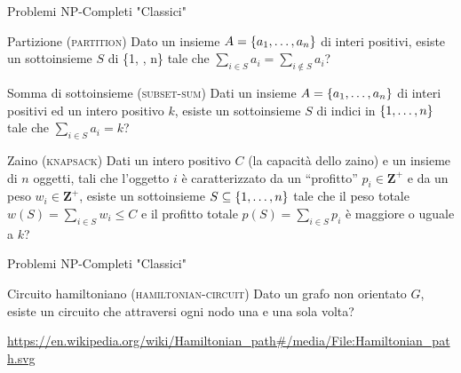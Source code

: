\begin{frame}{Problemi NP-Completi "Classici"}

\vspace{-9pt}
\begin{block}{Partizione (\textsc{partition})}
Dato un insieme $A = \{ a_1, \ldots, a_n\}$ di interi positivi, esiste un
sottoinsieme $S$ di \{1, \mldots, n\} tale che $\sum_{i\in S} a_i = \sum_{i
\notin S}a_i$?
\end{block}

\begin{block}{Somma di sottoinsieme (\textsc{subset-sum})}
Dati un insieme $A = \{ a_1 , \ldots, a_n\}$ di interi positivi ed un intero
positivo $k$, esiste un sottoinsieme $S$ di indici in $\{1, \ldots, n\}$ tale
che $\sum_{i \in S} a_i = k$?
\end{block}

\begin{block}{Zaino (\textsc{knapsack})}
Dati un intero positivo $C$ (la capacità dello zaino) e un insieme di $n$ oggetti, tali che l'oggetto $i$ è caratterizzato da un ``profitto'' $p_i \in \mathbf{Z}^+$ e da un peso $w_i \in \mathbf{Z}^+$, esiste un sottoinsieme $S \subseteq \{ 1, \ldots, n \}$ tale che il peso totale $w(S) = \sum_{i \in S} w_i \le C$ e il profitto totale $p(S) = \sum_{i \in S} p_i$ è maggiore o uguale a $k$?
\end{block}

\end{frame}

\begin{frame}{Problemi NP-Completi "Classici"}

\vspace{-9pt}
\begin{block}{Circuito hamiltoniano (\textsc{hamiltonian-circuit})}
Dato un grafo non orientato $G$, esiste un circuito che attraversi ogni nodo
una e una sola volta?
\end{block}

\begin{center}
\end{center}

\vfill
\tiny
\url{https://en.wikipedia.org/wiki/Hamiltonian\_path\#/media/File:Hamiltonian\_path.svg}

\end{frame}

